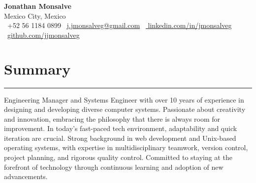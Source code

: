 \documentclass[a4paper,10pt]{article}
\begin{document}
\begin{center}
	{\LARGE \textbf{Jonathan Monsalve}} \\[0.5em]
	Mexico City, Mexico \\
	\faPhone \ +52 56 1184 0899 \hspace{1em}
	\faEnvelope \ \href{mailto:j.jmonsalveg@gmail.com}{j.jmonsalveg@gmail.com}
	\hspace{1em}
	\faLinkedin \ \href{https://www.linkedin.com/in/jjmonsalveg/}{
		linkedin.com/in/jmonsalveg} \hspace{1em}
	\faGithub \ \href{https://github.com/jjmonsalveg}{github.com/jjmonsalveg}
\end{center}

\vspace{0.5em}

\newcommand{\sectionline}{
	\noindent\rule{\linewidth}{0.4pt}\vspace{0.1em}
}

\section*{Summary}
\sectionline
Engineering Manager and Systems Engineer with over 10 years of experience in
designing and developing diverse computer systems. Passionate about creativity
and innovation, embracing the philosophy that there is always room for
improvement. In today's fast-paced tech environment, adaptability and quick
iteration are crucial. Strong background in web development and Unix-based
operating systems, with expertise in multidisciplinary teamwork, version
control, project planning, and rigorous quality control. Committed to staying
at the forefront of technology through continuous learning and adoption of
new advancements.

\end{document}
